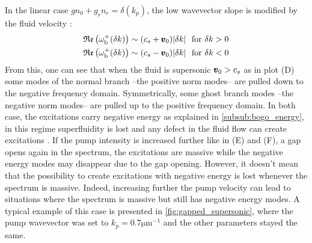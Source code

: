 In the linear case $gn_0+g_rn_r=\delta(k_p)$, the low wavevector slope is modified by the fluid velocity :
\begin{equation}
    \begin{aligned}
    \mathfrak{Re}\left(\omega_{\mathrm{b}}^+(\delta k)\right)& \sim (c_s + \pmb{v}_0)\abs{\delta k} \ \ \mathrm{for} \ \delta k > 0 \\
    \mathfrak{Re}\left(\omega_{\mathrm{b}}^+(\delta k)\right)& \sim (c_s - \pmb{v}_0)\abs{\delta k} \ \ \mathrm{for} \ \delta k < 0
    \end{aligned}
\end{equation}
From this, one can see that when the fluid is supersonic $\pmb{v}_0>c_s$ as in plot (D) some modes of the normal branch --the positive norm modes-- are pulled down to the negative frequency domain. Symmetrically, some ghost branch modes --the negative norm modes-- are pulled up to the positive frequency domain.
In both case, the excitations carry negative energy as explained in \autoref{subsub:bogo_energy}, in this regime superfluidity is lost and any defect in the fluid flow 
can create excitations \cite{Amo_fluidlightexp_2009}. If the pump intensity is increased further like in (E) and (F), a gap opens again in the spectrum, the excitations are massive while
the negative energy modes may disappear due to the gap opening. However, it doesn't mean that the possibility to create excitations with negative energy 
is lost whenever the spectrum is massive. Indeed, increasing further the pump velocity can lead to situations where the spectrum is massive but still has negative energy modes.
A typical example of this case is presented in \autoref{fig:gapped_supersonic}, where the pump wavevector was set to $k_p=0.7 \mathrm{\mu m^{-1}}$ and the other parameters stayed the same. 
